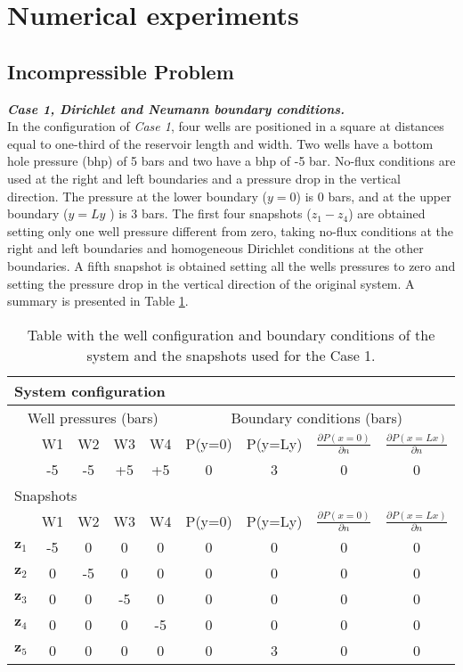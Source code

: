 \documentclass[12pt]{article}
\numberwithin{equation}{section}
\begin{document}
\newpage
\section{Numerical experiments}\label{numexp}
\subsection{Incompressible Problem}
\textbf{\emph{Case 1, Dirichlet and Neumann boundary conditions.}}\\
In the configuration of \emph{Case 1}, four wells are positioned in a square at distances equal 
to one-third of the reservoir length and width. Two wells have a bottom hole pressure (bhp) of 5 bars and two have 
a bhp of -5 bar. No-flux conditions are used at the right and left boundaries and a pressure drop
in the vertical direction. The pressure at the lower boundary ($y=0$) is 0 bars, and at
the upper boundary ($y=Ly$ ) is 3 bars. 
The first four snapshots ($z_1-z_4$) are obtained setting only one well pressure
different from zero, taking no-flux conditions at the right and left boundaries and 
homogeneous Dirichlet conditions at the other boundaries. A fifth snapshot is obtained 
setting all the wells pressures to zero and setting the pressure drop in the vertical 
direction of the original system. 
A summary is presented in Table \ref{table:c1}.
\renewcommand{\arraystretch}{1.5}
\begin{table}[!ht]\centering
\begin{minipage}{.8\textwidth}
\vspace{-10pt}
\centering
\begin{tabular}{ |c|c|c|c|c|c|c|c|c|} 
 \hline
  \multicolumn{9}{|l|}{System configuration} \\ 
  \hline
  \multicolumn{5}{|c|}{Well pressures (bars)}&\multicolumn{4}{|c|}{Boundary conditions (bars)}\\
  \hline
  &W1 &W2 &W3 &W4 &P(y=0) & P(y=Ly)&$\frac{\partial P(x=0)}{\partial n}$ & $\frac{\partial P(x=Lx)}{\partial n}$\\
  \hline
& -5& -5& +5& +5& 0& 3&0 &0 \\
\hline
\multicolumn{9}{|l|}{Snapshots} \\
\hline
  &W1 &W2 &W3 &W4 &P(y=0) & P(y=Ly)&$\frac{\partial P(x=0)}{\partial n}$ & $\frac{\partial P(x=Lx)}{\partial n}$\\
  \hline
$\mathbf{z}_1$& -5&0 &0 &0 &0 &0 &0 &0 \\
$\mathbf{z}_2$& 0& -5& 0& 0& 0& 0& 0& 0\\
$\mathbf{z}_3$& 0& 0& -5& 0& 0& 0& 0& 0\\
$\mathbf{z}_4$& 0& 0& 0& -5&0 & 0& 0&0 \\
$\mathbf{z}_5$& 0& 0& 0& 0& 0& 3& 0&0 \\
 \hline
\end{tabular}
\caption{Table with the well configuration and boundary conditions of the system and the snapshots used for the Case 1.}
\label{table:c1}
\end{minipage}
\end{table}
\end{document}
